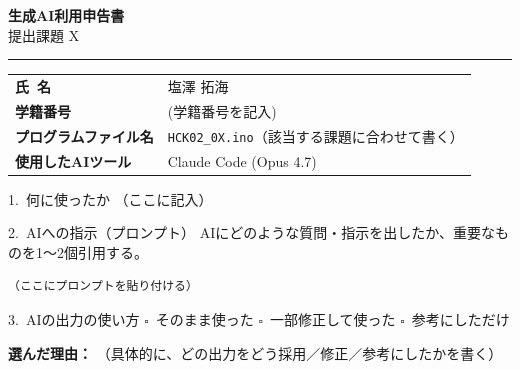 \documentclass[a4paper,11pt,dvipdfmx]{jsarticle}
\newcommand{\cboxoff}{$\square$\ }
\newcommand{\assignname}{提出課題 X}
\begin{document}
\begin{center}
  {\LARGE\bfseries\color{headerblue}生成AI利用申告書}\\[2pt]
  {\small\color{accentblue}\assignname}
\end{center}
\vspace{2pt}
\textcolor{accentblue}{\rule{\textwidth}{1.2pt}}
\vspace{6pt}

\noindent
\begin{tabularx}{\textwidth}{@{}l X@{}}
  \textbf{氏\ 名}               & 塩澤 拓海 \\
  \textbf{学籍番号}             & (学籍番号を記入) \\
  \textbf{プログラムファイル名} & \texttt{HCK02\_0X.ino}（該当する課題に合わせて書く） \\
  \textbf{使用したAIツール}     & Claude Code (Opus 4.7) \\
\end{tabularx}

\vspace{10pt}

\begin{itembox}{1.\ 何に使ったか}
（ここに記入）
\end{itembox}

\begin{itembox}{2.\ AIへの指示（プロンプト）}
AIにどのような質問・指示を出したか、重要なものを1〜2個引用する。

\begin{lstlisting}[style=promptstyle]
（ここにプロンプトを貼り付ける）
\end{lstlisting}
\end{itembox}

\begin{itembox}{3.\ AIの出力の使い方}
\cboxoff そのまま使った\quad
\cboxoff 一部修正して使った\quad
\cboxoff 参考にしただけ

\vspace{4pt}
\textbf{選んだ理由：}
（具体的に、どの出力をどう採用／修正／参考にしたかを書く）
\end{itembox}
\end{document}
